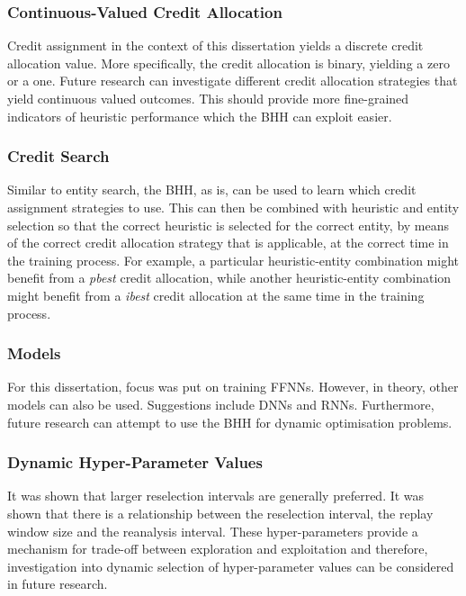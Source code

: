 \subsubsection{Continuous-Valued Credit Allocation}
\label{sec:conclusion:further_research:continuous_credit}

Credit assignment in the context of this dissertation yields a discrete credit allocation value. More specifically, the credit allocation is binary, yielding a zero or a one. Future research can investigate different credit allocation strategies that yield continuous valued outcomes. This should provide more fine-grained indicators of heuristic performance which the \acs{BHH} can exploit easier.

\subsubsection{Credit Search}
\label{sec:conclusion:further_research:credit_search}

Similar to entity search, the \acs{BHH}, as is, can be used to learn which credit assignment strategies to use. This can then be combined with heuristic and entity selection so that the correct heuristic is selected for the correct entity, by means of the correct credit allocation strategy that is applicable, at the correct time in the training process. For example, a particular heuristic-entity combination might benefit from a \textit{pbest} credit allocation, while another heuristic-entity combination might benefit from a \textit{ibest} credit allocation at the same time in the training process.

\subsubsection{Models}
\label{sec:conclusion:further_research:models}

For this dissertation, focus was put on training \acp{FFNN}. However, in theory, other models can also be used. Suggestions include \acp{DNN} and \acp{RNN}. Furthermore, future research can attempt to use the \acs{BHH} for dynamic optimisation problems.


\subsubsection{Dynamic Hyper-Parameter Values}
\label{sec:conclusion:further_research:dynamic_hyper_parameters}

It was shown that larger reselection intervals are generally preferred. It was shown that there is a relationship between the reselection interval, the replay window size and the reanalysis interval. These hyper-parameters provide a mechanism for trade-off between exploration and exploitation and therefore, investigation into dynamic selection of hyper-parameter values can be considered in future research.


